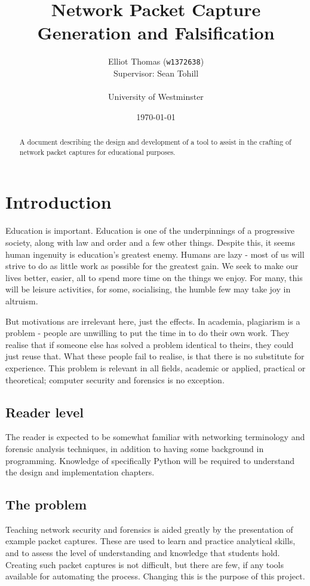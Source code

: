 \documentclass[10pt,a4paper,notitlepage]{report}
\author{Elliot Thomas (\texttt{w1372638})\\ \small Supervisor: Sean Tohill\\ \\ University of Westminster}
\title{Network Packet Capture Generation and Falsification}
\date{\today}
\begin{document}
\maketitle
\begin{abstract}
\begin{center}
A document describing the design and development of a tool to assist in the crafting of network packet captures for educational purposes.
\end{center}
\end{abstract}
\pagebreak
\listoffigures
\lstlistoflistings
\tableofcontents

\chapter{Introduction}
Education is important. Education is one of the underpinnings of a progressive society, along with law and order and a few other things.
Despite this, it seems human ingenuity is education's greatest enemy. Humans are lazy - most of us will strive to do as little work as possible for the greatest gain.
We seek to make our lives better, easier, all to spend more time on the things we enjoy. For many, this will be leisure activities, for some, socialising, the humble few may take joy in altruism.

But motivations are irrelevant here, just the effects.
In academia, plagiarism is a problem - people are unwilling to put the time in to do their own work. They realise that if someone else has solved a problem identical to theirs, they could just reuse that.
What these people fail to realise, is that there is no substitute for experience. This problem is relevant in all fields, academic or applied, practical or theoretical; computer security and forensics is no exception.

\section{Reader level}
The reader is expected to be somewhat familiar with networking terminology and forensic analysis techniques, in addition to having some background in programming. Knowledge of specifically Python will be required to understand the design and implementation chapters.

\section{The problem}
Teaching network security and forensics is aided greatly by the presentation of example packet captures. These are used to learn and practice analytical skills, and to assess the level of understanding and knowledge that students hold.
Creating such packet captures is not difficult, but there are few, if any tools available for automating the process. Changing this is the purpose of this project.
\end{document}
